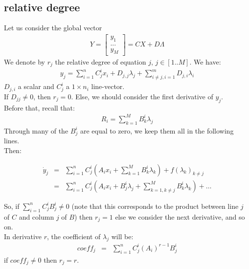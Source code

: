 \documentclass[10pt]{report}
\begin{document}
\subsection{relative degree}
Let us consider the global vector
\begin{eqnarray}
Y =\left[\begin{array}{c}
y_1 \\
...  \\
y_M
\end{array}\right] = CX + D\Lambda
\end{eqnarray}
We denote by $r_j$ the relative degree of equation $j$, $j\in [1..M]$.
We have:
\begin{eqnarray}
y_j = \displaystyle{\sum_{i=1}^n C_j^i x_i +D_{j,j}\lambda_j + \sum_{i\neq j, i=1}^m D_{j,i} \lambda_i }
\end{eqnarray}
$D_{j,i}$ a scalar and $C_j^i$ a $1 \times n_i$ line-vector. \\
If $D_{jj} \neq 0$, then $r_j=0$. Else, we should consider the first derivative of $y_j$. \\
Before that, recall that:
\begin{eqnarray}
R_i = \displaystyle{\sum_{k=1}^M B_k^i \lambda_j}
\end{eqnarray}
Through many of the $B_j^i$ are equal to zero, we keep them all in the following lines. \\
Then:

\begin{eqnarray}
\dot y_j &=& \displaystyle{\sum_{i=1}^n C_j^i (A_i x_i +  \sum_{k=1}^M B_k^i \lambda_k  ) + f(\lambda_k)_{k\neq j}} \\
&=& \displaystyle{\sum_{i=1}^n C_j^i (A_i x_i + B_j^i \lambda_j + \sum_{k=1,k\neq j}^M B_k^i \lambda_k  ) + \ldots}
\end{eqnarray}

So, if $\displaystyle{\sum_{i=1}^n C_j^i B_j^i} \neq 0$ (note that this corresponds to the product between line $j$ of $C$ and column $j$ of $B$)
then $r_j=1$ else we consider the next derivative, and so on.  \\
In derivative $r$, the coefficient of $\lambda_j$ will be:
\begin{eqnarray}
coeff_j&=& \displaystyle{\sum_{i=1}^n C_j^i (A_i)^{r-1} B_j^i }
\end{eqnarray}
if $coeff_j\neq 0$ then $r_j = r$.
\end{document}
